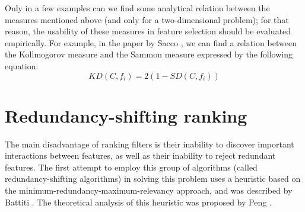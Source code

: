 \documentclass[a4paper,fleqn]{report}
\newcommand\be{\vspace*{1pt}\begin{equation}}
\newcommand\ee{\end{equation}\vspace*{1pt}}
\begin{document}
Only in a few examples can we find some analytical relation between the measures mentioned above 
(and only for a two-dimensional problem);
for that reason, the usability of these measures in feature selection should be evaluated empirically. 
For example, in the paper by Sacco \cite{Sacco1972},
we can find a relation between the Kollmogorov measure and the Sammon measure expressed by the following equation:
\be
KD(C,f_i)=2\left(1-SD(C,f_i)\right)
\ee


\section{Redundancy-shifting ranking}

The main disadvantage of ranking filters is their inability to discover important interactions between features,
as well as their inability to reject redundant features. 
The first attempt to employ this group of algorithms (called redundancy-shifting algorithms) in solving this problem 
uses a heuristic based on the minimum-redundancy-maximum-relevancy approach, 
and was described by Battiti \cite{Battiti1994}.
The theoretical analysis of this heuristic was proposed by Peng \cite{Peng2005}. 
\ \\
\end{document}
